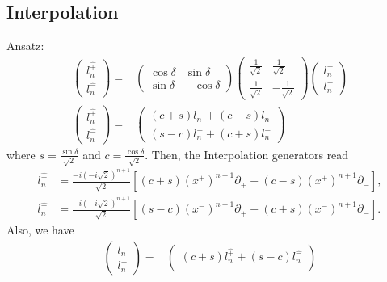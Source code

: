 \documentclass[]{article}
\numberwithin{equation}{section}
\begin{document}
{{\subsection{Interpolation}
Ansatz:
\begin{align}
    \begin{pmatrix}
        l^{\hat{+}}_n\\
        l^{\hat{-}}_n
    \end{pmatrix}=&\begin{pmatrix}
        \cos{\delta}&\sin{\delta}\\
        \sin{\delta}&-\cos{\delta}
    \end{pmatrix}\begin{pmatrix}
        \frac{1}{\sqrt{2}}&\frac{1}{\sqrt{2}}\\
        \frac{1}{\sqrt{2}}&-\frac{1}{\sqrt{2}}
    \end{pmatrix}\begin{pmatrix}
        l^{+}_n\\
        l^{-}_n
    \end{pmatrix}\\
    \begin{pmatrix}
        l^{\hat{+}}_n\\
        l^{\hat{-}}_n
    \end{pmatrix}=&\begin{pmatrix}
        (c+s)l^{+}_n+(c-s)l^{-}_n\\
        (s-c)l^{+}_n+(c+s)l^{-}_n
    \end{pmatrix}
\end{align}
where $s=\frac{\sin{\delta}}{\sqrt{2}}$ and $c=\frac{\cos{\delta}}{\sqrt{2}}$. Then, the Interpolation generators read
\begin{align}
    l^{\hat{+}}_n&=\frac{-i(-i\sqrt{2})^{n+1}}{\sqrt{2}}\left[(c+s)\left(x^{+}\right)^{n+1}\partial_{+}+(c-s)\left(x^{+}\right)^{n+1}\partial_{-}\right],\\
    l^{\hat{-}}_n&=\frac{-i(-i\sqrt{2})^{n+1}}{\sqrt{2}}\left[(s-c)\left(x^{-}\right)^{n+1}\partial_{+}+(c+s)\left(x^{-}\right)^{n+1}\partial_{-}\right].
\end{align}
Also, we have
\begin{align}
    \begin{pmatrix}
        l^{+}_n\\
        l^{-}_n
    \end{pmatrix}=&\begin{pmatrix}
        (c+s)l^{\hat{+}}_n+(s-c)l^{\hat{-}}_n\\

\end{pmatrix}
\end{align}}}
\end{document}
